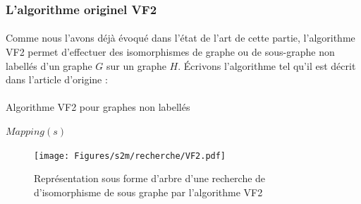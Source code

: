 \documentclass[12pt,french,twoside]{report}
\begin{document}
\subsubsection{L'algorithme originel VF2}

\label{VF2_p}

\paragraph{}Comme nous l'avons déjà évoqué dans l'état de l'art de cette partie, l'algorithme VF2 permet d'effectuer des
isomorphismes de graphe ou de sous-graphe non labellés d'un graphe $G$ sur un graphe $H$.
Écrivons l'algorithme tel qu'il est décrit dans l'article d'origine :

\paragraph{}
  \begin{algorithm}[H]
    \caption{Algorithme VF2 pour graphes non labellés}
    
     {
      \KwRet $Mapping(s)$\;
    } 
  \end{algorithm}

\begin{figure}[!h]
  \texttt{[image: Figures/s2m/recherche/VF2.pdf]}
  \caption{\label{vf2}Représentation sous forme d'arbre d'une recherche de d'isomorphisme de sous graphe par l'algorithme VF2}
\end{figure}
\end{document}
